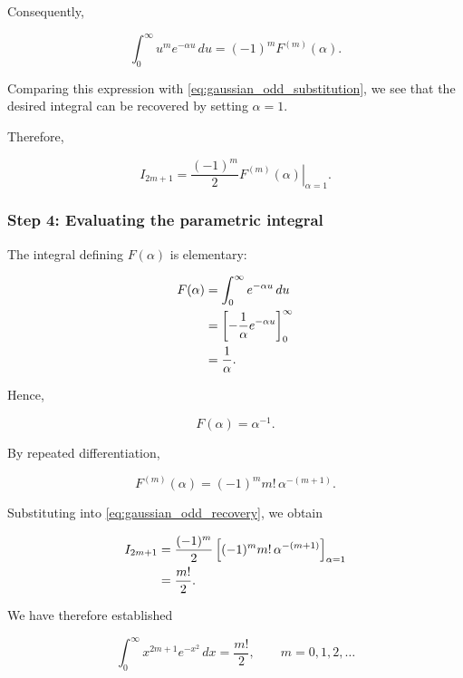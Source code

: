 \documentclass[11pt,a4paper]{article}
\theoremstyle{definition}
\theoremstyle{remark}
\begin{document}
Consequently,

\begin{equation}
    \int_0^\infty
    u^m e^{-\alpha u}\,du
    =
    (-1)^m F^{(m)}(\alpha).
    \label{eq:gaussian_odd_identity}
\end{equation}

Comparing this expression with
\eqref{eq:gaussian_odd_substitution},
we see that the desired integral
can be recovered by setting
$\alpha=1$.

Therefore,

\begin{equation}
    I_{2m+1}
    =
    \frac{(-1)^m}{2}
    \left.
    F^{(m)}(\alpha)
    \right|_{\alpha=1}.
    \label{eq:gaussian_odd_recovery}
\end{equation}

\subsubsection*{Step 4: Evaluating the parametric integral}

The integral defining $F(\alpha)$
is elementary:

\begin{align}
    F(\alpha)
    &=
    \int_0^\infty e^{-\alpha u}\,du
    \notag\\
    &=
    \left[
    -\frac{1}{\alpha}e^{-\alpha u}
    \right]_0^\infty
    \notag\\
    &=
    \frac{1}{\alpha}.
\end{align}

Hence,

\[
    F(\alpha)=\alpha^{-1}.
\]

By repeated differentiation,

\begin{equation}
    F^{(m)}(\alpha)
    =
    (-1)^m m!\,\alpha^{-(m+1)}.
    \label{eq:gaussian_odd_factorial}
\end{equation}

Substituting into
\eqref{eq:gaussian_odd_recovery},
we obtain

\begin{align}
    I_{2m+1}
    &=
    \frac{(-1)^m}{2}
    \left[
    (-1)^m m!\,\alpha^{-(m+1)}
    \right]_{\alpha=1}
    \notag\\
    &=
    \frac{m!}{2}.
\end{align}

We have therefore established

\begin{equation}
    \boxed{
    \int_0^\infty
    x^{2m+1}e^{-x^2}\,dx
    =
    \frac{m!}{2},
    \qquad m=0,1,2,\ldots
    }
    \label{eq:gaussian_odd_result}
\end{equation}
\end{document}

